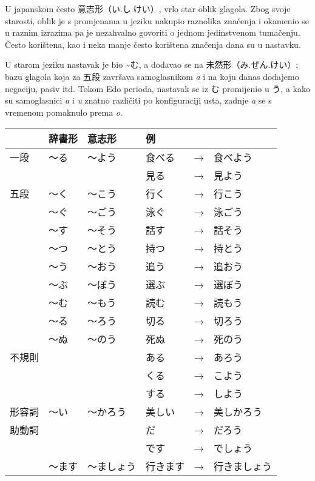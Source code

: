 
\author{Tomislav Mamić}

	\footnotemark[1]
	
	
	U japanskom često 意志形（い.し.けい）, vrlo star oblik glagola.
	Zbog svoje starosti, oblik je s promjenama u jeziku nakupio raznolika značenja i okamenio se u raznim izrazima pa je nezahvalno govoriti o jednom jedinstvenom tumačenju.
	Često korištena, kao i neka manje često korištena značenja dana su u nastavku.
	
	
	U starom jeziku nastavak je bio \textasciitilde む, a dodavao se na 未然形（み.ぜん.けい）; bazu glagola koja za 五段 završava samoglasnikom \textit{a} i na koju danas dodajemo negaciju, pasiv itd. Tokom Edo perioda, nastavak se iz む promijenio u う, a kako su samoglasnici \textit{a} i \textit{u} znatno različiti po konfiguraciji usta, zadnje \textit{a} se s vremenom pomaknulo prema \textit{o}.
	
	\begin{table}[h]
		\centering
		\begin{tabular}{llllll}
			\toprule[2pt]
			& 辞書形 & 意志形 & 例 & & \\
			\midrule
			一段 & 〜る & 〜よう & 食べる&→&食べよう \\
			& & & 見る&→&見よう \\
			\midrule
			五段 & 〜く & 〜こう & 行く&→&行こう\\
			& 〜ぐ & 〜ごう & 泳ぐ&→&泳ごう\\
			& 〜す & 〜そう & 話す&→&話そう\\
			& 〜つ & 〜とう & 持つ&→&持とう\\
			& 〜う & 〜おう & 追う&→&追おう\\
			& 〜ぶ & 〜ぼう & 選ぶ&→&選ぼう\\
			& 〜む & 〜もう & 読む&→&読もう\\
			& 〜る & 〜ろう & 切る&→&切ろう\\
			& 〜ぬ & 〜のう & 死ぬ&→&死のう\\
			\midrule
			不規則 & & & ある &→& あろう \\
			& & & くる &→& こよう \\
			& & & する &→& しよう \\
			\midrule
			形容詞 & 〜い & 〜かろう & 美しい&→&美しかろう \\
			\midrule
			助動詞 & & & だ &→& だろう \\
			& & & です &→& でしょう \\
			& 〜ます & 〜ましょう & 行きます&→&行きましょう \\
			\bottomrule[2pt]
		\end{tabular}
	\end{table}

